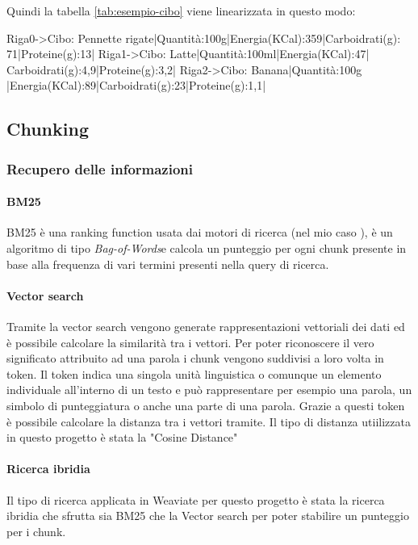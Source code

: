 Quindi la tabella \ref{tab:esempio-cibo} viene linearizzata in questo modo:
\begin{tcolorbox}[colback=white, colframe=black]
    Riga0->Cibo: Pennette rigate|Quantità:100g|Energia(KCal):359|Carboidrati(g): \\
    71|Proteine(g):13| Riga1->Cibo: Latte|Quantità:100ml|Energia(KCal):47| \\
    Carboidrati(g):4,9|Proteine(g):3,2| Riga2->Cibo: Banana|Quantità:100g \\
    |Energia(KCal):89|Carboidrati(g):23|Proteine(g):1,1|
\end{tcolorbox}

\subsection{Chunking}

\subsubsection{Recupero delle informazioni}
\paragraph{\gls{BM25}}
BM25 è una ranking function usata dai motori di ricerca (nel mio caso ), è un algoritmo di tipo \emph{\gls{Bag-of-Words}}\glsfirstoccur e calcola un punteggio per ogni chunk
presente in base alla frequenza di vari termini presenti nella query di ricerca. 

\paragraph{Vector search}
Tramite la vector search vengono generate rappresentazioni vettoriali dei dati ed è possibile calcolare la similarità tra i vettori.
Per poter riconoscere il vero significato attribuito ad una parola i chunk vengono suddivisi a loro volta in token.
Il token indica una singola unità linguistica o comunque un elemento individuale all'interno di un testo e può rappresentare per esempio una parola, un simbolo di punteggiatura o anche una parte di una parola.
Grazie a questi token è possibile calcolare la distanza tra i vettori tramite.
Il tipo di distanza utiilizzata in questo progetto è stata la "Cosine Distance"

\paragraph{Ricerca ibridia}
Il tipo di ricerca applicata in Weaviate per questo progetto è stata la ricerca ibridia che sfrutta sia BM25 che la Vector search per poter stabilire un punteggio per i chunk.


